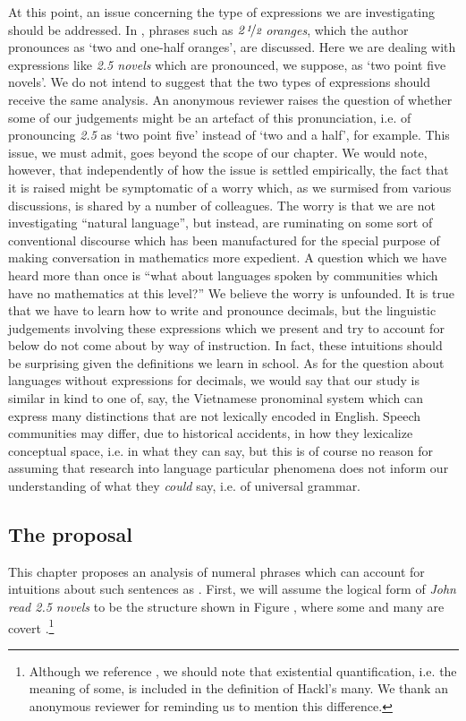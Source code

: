 \documentclass[output=paper]{langscibook}
\begin{document}
At this point, an issue concerning the type of expressions we are investigating should be addressed. In \citet{salmon1997}, phrases such as  $\textit{2}\,\nicefrac{\textit{1}}{\textit{2}}$ \textit{oranges}, which the author pronounces as `two and one-half oranges', are discussed. Here we are dealing with expressions like \textit{2.5 novels} which are pronounced, we suppose, as `two point five novels'. We do not intend to suggest that the two types of expressions should receive the same analysis. An anonymous reviewer raises the question of whether some of our judgements might be an artefact of this pronunciation, i.e. of pronouncing \textit{2.5} as `two point five' instead of `two and a half', for example. This issue, we must admit, goes beyond the scope of our chapter. We would note, however, that independently of how the issue is settled empirically, the fact that it is raised might be symptomatic of a worry which, as we surmised from various discussions, is shared by a number of colleagues. The worry is that we are not investigating ``natural language'', but instead, are ruminating on some sort of conventional discourse which has been manufactured for the special purpose of making conversation in mathematics more expedient. A question which we have heard more than once is ``what about languages spoken by communities which have no mathematics at this level?'' We believe the worry is unfounded. It is true that we have to learn how to write and pronounce decimals, but the linguistic judgements involving these expressions which we present and try to account for below do not come about by way of instruction. In fact, these intuitions should be surprising given the definitions we learn in school. As for the question about languages without expressions for decimals, we would say that our study is similar in kind to one of, say, the Vietnamese pronominal system which can express many distinctions that are not lexically encoded in English. Speech communities may differ, due to historical accidents, in how they lexicalize conceptual space, i.e. in what they can say, but this is of course no reason for assuming that research into language particular phenomena does not inform our understanding of what they \textit{ could} say, i.e. of universal grammar.


\subsection{The proposal} 

This chapter proposes an analysis of numeral phrases which can account for intuitions about such sentences as . First, we will assume the logical form of \textit{John read 2.5 novels} to be the structure shown in Figure , where {\sc some} and {\sc many} are covert \citep[cf.][]{Hackl:2000}.\footnote{Although we reference \citet{Hackl:2000}, we should note that existential quantification, i.e. the meaning of {\sc some}, is included in the definition of Hackl's {\sc many}. We thank an anonymous reviewer for reminding us to mention this difference.}
\end{document}
